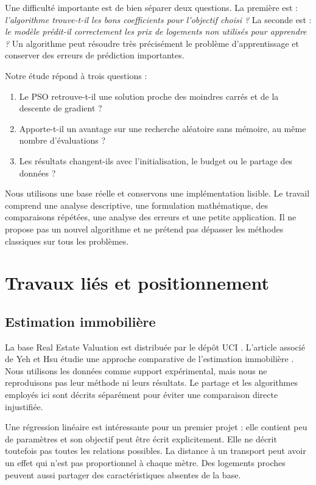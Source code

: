 \documentclass[conference,a4paper]{IEEEtran}
\begin{document}
Une difficulté importante est de bien séparer deux questions. La première est : \textit{l'algorithme trouve-t-il les bons coefficients pour l'objectif choisi ?} La seconde est : \textit{le modèle prédit-il correctement les prix de logements non utilisés pour apprendre ?} Un algorithme peut résoudre très précisément le problème d'apprentissage et conserver des erreurs de prédiction importantes.

Notre étude répond à trois questions :
\begin{enumerate}
\item Le PSO retrouve-t-il une solution proche des moindres carrés et de la descente de gradient ?
\item Apporte-t-il un avantage sur une recherche aléatoire sans mémoire, au même nombre d'évaluations ?
\item Les résultats changent-ils avec l'initialisation, le budget ou le partage des données ?
\end{enumerate}
Nous utilisons une base réelle et conservons une implémentation lisible. Le travail comprend une analyse descriptive, une formulation mathématique, des comparaisons répétées, une analyse des erreurs et une petite application. Il ne propose pas un nouvel algorithme et ne prétend pas dépasser les méthodes classiques sur tous les problèmes.

\section{Travaux liés et positionnement}
\subsection{Estimation immobilière}
La base Real Estate Valuation est distribuée par le dépôt UCI \cite{uci}. L'article associé de Yeh et Hsu étudie une approche comparative de l'estimation immobilière \cite{yeh}. Nous utilisons les données comme support expérimental, mais nous ne reproduisons pas leur méthode ni leurs résultats. Le partage et les algorithmes employés ici sont décrits séparément pour éviter une comparaison directe injustifiée.

Une régression linéaire est intéressante pour un premier projet : elle contient peu de paramètres et son objectif peut être écrit explicitement. Elle ne décrit toutefois pas toutes les relations possibles. La distance à un transport peut avoir un effet qui n'est pas proportionnel à chaque mètre. Des logements proches peuvent aussi partager des caractéristiques absentes de la base.
\end{document}
